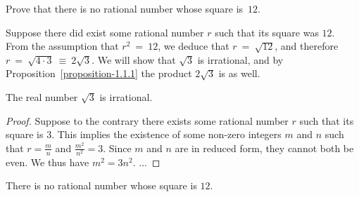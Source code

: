 \begin{exercise}
	Prove that there is no rational number whose square is~$12$.
\end{exercise}

Suppose there did exist some rational number $r$ such that its square was $12$. From the assumption that $r^2~=~12$, we deduce that $r~=~\sqrt{12}$, and therefore $r~=~\sqrt{4 \cdot 3}~\equiv~2\sqrt{3}$. We will show that $\sqrt{3}$ is irrational, and by Proposition~\ref{proposition-1.1.1} the product $2\sqrt{3}$ is as well.

\begin{proposition}
	The real number $\sqrt{3}$ is irrational.
\end{proposition}
\begin{proof}
	Suppose to the contrary there exists some rational number $r$ such that its square is $3$. This implies the existence of some non-zero integers $m$ and $n$ such that $r=\frac{m}{n}$ and $\frac{m^2}{n^2}=3$. Since $m$ and $n$ are in reduced form, they cannot both be even.
	\newline\newline
	We thus have $m^2=3n^2$. ...
\end{proof}

\begin{proposition}
	There is no rational number whose square is $12$.
\end{proposition}
